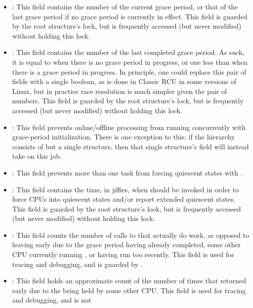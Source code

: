 \begin{itemize}
\item	{}:
	This field contains the number of the current grace period,
	or that of the last grace period if no grace period is currently
	in effect.
	This field is guarded by the root  structure's lock,
	but is frequently accessed (but never modified) without holding
	this lock.
\item	{}:
	This field contains the number of the last completed grace period.
	As such, it is equal to  when there is no grace period
	in progress, or one less than  when there is a
	grace period in progress.
	In principle, one could replace this pair of fields with a single
	boolean, as is done in Classic RCU in some versions of Linux,
	but in practice race resolution is much simpler given the pair
	of numbers.
	This field is guarded by the root  structure's lock,
	but is frequently accessed (but never modified) without holding
	this lock.
\item	{}:
	This field prevents online/offline processing from running
	concurrently with grace-period initialization.
	There is one exception to this: if the 
	hierarchy consists of but a single structure, then
	that single structure's  field will instead take on
	this job.
\item	{}:
	This field prevents more than one task from forcing quiescent
	states with .
\item	{}:
	This field contains the time, in jiffies, when
	 should be invoked in order to
	force CPUs into quiescent states and/or report extended
	quiescent states.
	This field is guarded by the root  structure's lock,
	but is frequently accessed (but never modified) without holding
	this lock.
\item	{}:
	This field counts the number of calls to 
	that actually do work, as opposed to leaving early due to
	the grace period having already completed, some other
	CPU currently running ,
	or  having run too recently.
	This field is used for tracing and debugging, and
	is guarded by .
\item	{}:
	This field holds an approximate count of the number of times that
	 returned early due to the
	 being held by some other CPU.
	This field is used for tracing and debugging, and is not

\end{itemize}

